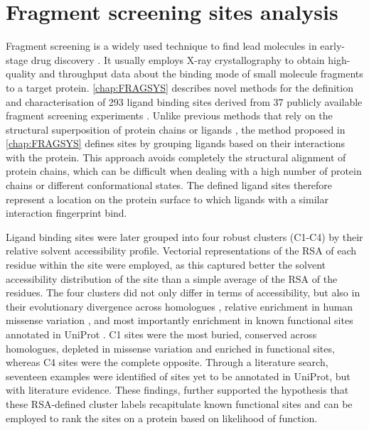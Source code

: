 \section{Fragment screening sites analysis}

Fragment screening is a widely used technique to find lead molecules in early-stage drug discovery \cite{MURRAY_2009_FBDD}. It usually employs X-ray crystallography to obtain high-quality and throughput data about the binding mode of small molecule fragments to a target protein. \autoref{chap:FRAGSYS} describes novel methods for the definition and characterisation of 293 ligand binding sites derived from 37 publicly available fragment screening experiments \cite{UTGES_2024_FRAGSYS}. Unlike previous methods that rely on the structural superposition of protein chains or ligands \cite{SHIN_2005_PDBLIGAND, KOZAKOV_2005_CLUSTERING, WASS_2010_3DLIGANDSITE}, the method proposed in \autoref{chap:FRAGSYS} defines sites by grouping ligands based on their interactions with the protein. This approach avoids completely the structural alignment of protein chains, which can be difficult when dealing with a high number of protein chains or different conformational states. The defined ligand sites therefore represent a location on the protein surface to which ligands with a similar interaction fingerprint bind.

Ligand binding sites were later grouped into four robust clusters (C1-C4) by their relative solvent accessibility profile. Vectorial representations of the RSA \cite{TIEN_2013_RSA} of each residue within the site were employed, as this captured better the solvent accessibility distribution of the site than a simple average of the RSA of the residues. The four clusters did not only differ in terms of accessibility, but also in their evolutionary divergence across homologues \cite{UTGES_2021_ANKS}, relative enrichment in human missense variation \cite{MACGOWAN_2024_VARIANTS}, and most importantly enrichment in known functional sites annotated in UniProt \cite{UNIPROT_2018_UNIPROT}. C1 sites were the most buried, conserved across homologues, depleted in missense variation and enriched in functional sites, whereas C4 sites were the complete opposite. Through a literature search, seventeen examples were identified of sites yet to be annotated in UniProt, but with literature evidence. These findings, further supported the hypothesis that these RSA-defined cluster labels recapitulate known functional sites and can be employed to rank the sites on a protein based on likelihood of function.

